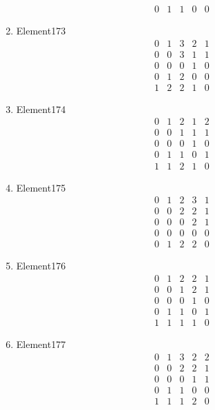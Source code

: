 \documentclass[12pt]{article}
\begin{document}
\begin{multicols}{3}
\begin{enumerate}
\begin{equation*}
\begin{array}{ccccc}
0&1&1&0&0
\end{array}
\end{equation*}
\item Element173
\begin{equation*}
\begin{array}{ccccc}
0&1&3&2&1\\
0&0&3&1&1\\
0&0&0&1&0\\
0&1&2&0&0\\
1&2&2&1&0
\end{array}
\end{equation*}
\item Element174
\begin{equation*}
\begin{array}{ccccc}
0&1&2&1&2\\
0&0&1&1&1\\
0&0&0&1&0\\
0&1&1&0&1\\
1&1&2&1&0
\end{array}
\end{equation*}
\item Element175
\begin{equation*}
\begin{array}{ccccc}
0&1&2&3&1\\
0&0&2&2&1\\
0&0&0&2&1\\
0&0&0&0&0\\
0&1&2&2&0
\end{array}
\end{equation*}
\item Element176
\begin{equation*}
\begin{array}{ccccc}
0&1&2&2&1\\
0&0&1&2&1\\
0&0&0&1&0\\
0&1&1&0&1\\
1&1&1&1&0
\end{array}
\end{equation*}
\item Element177
\begin{equation*}
\begin{array}{ccccc}
0&1&3&2&2\\
0&0&2&2&1\\
0&0&0&1&1\\
0&1&1&0&0\\
1&1&1&2&0
\end{array}
\end{equation*}

\end{enumerate}
\end{multicols}
\end{document}
